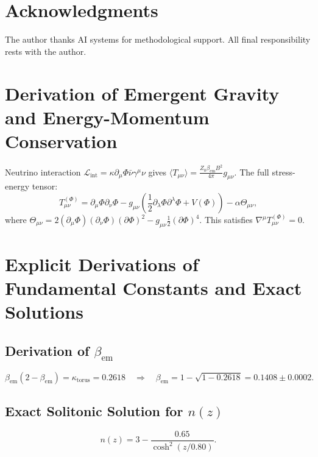 \documentclass[12pt, a4paper]{article}
\begin{document}
\section*{Acknowledgments}
The author thanks AI systems for methodological support. All final responsibility rests with the author.

\appendix
\section{Derivation of Emergent Gravity and Energy-Momentum Conservation}
\label{app:gravity}
Neutrino interaction $\mathcal{L}_{\mathrm{int}} = \kappa \partial_\mu \Phi \bar{\nu}\gamma^\mu \nu$ gives $\langle T_{\mu\nu} \rangle = \frac{Z_0 \beta_{\mathrm{em}} B^2}{4\pi} g_{\mu\nu}$. The full stress-energy tensor:
\begin{equation}
T_{\mu\nu}^{(\Phi)} = \partial_\mu \Phi \partial_\nu \Phi - g_{\mu\nu} \left( \frac{1}{2} \partial_\lambda \Phi \partial^\lambda \Phi + V(\Phi) \right) - \alpha \Theta_{\mu\nu},
\label{eq:stress_energy}
\end{equation}
where $\Theta_{\mu\nu} = 2(\partial_\mu \Phi)(\partial_\nu \Phi)(\partial \Phi)^2 - g_{\mu\nu} \frac{1}{2} (\partial \Phi)^4$. This satisfies $\nabla^\mu T_{\mu\nu}^{(\Phi)} = 0$.

\section{Explicit Derivations of Fundamental Constants and Exact Solutions}
\subsection{Derivation of $\beta_{\mathrm{em}}$}
\begin{equation}
\beta_{\mathrm{em}}(2 - \beta_{\mathrm{em}}) = \kappa_{\mathrm{torus}} = 0.2618 \quad \Rightarrow \quad \beta_{\mathrm{em}} = 1 - \sqrt{1 - 0.2618} = 0.1408 \pm 0.0002.
\label{eq:beta_derivation}
\end{equation}

\subsection{Exact Solitonic Solution for $n(z)$}
\begin{equation}
n(z) = 3 - \frac{0.65}{\cosh^2(z/0.80)}.
\label{eq:n_solution}
\end{equation}
\end{document}
